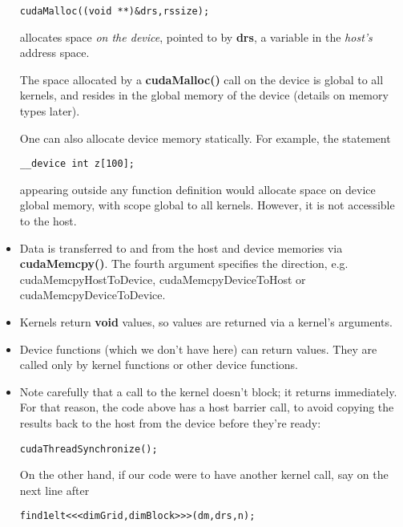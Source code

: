 \begin{itemize}
\begin{Verbatim}[fontsize=\relsize{-2}]
cudaMalloc((void **)&drs,rssize);
\end{Verbatim}

allocates space {\it on the device}, pointed to by {\bf drs}, a variable
in the {\it host's} address space.

The space allocated by a {\bf cudaMalloc()} call on the device is global
to all kernels, and resides in the global memory of the device (details
on memory types later).

One can also allocate device memory statically.  For example, the
statement

\begin{Verbatim}[fontsize=\relsize{-2}]
__device int z[100];
\end{Verbatim}

appearing outside any function definition would allocate space on device
global memory, with scope global to all kernels.  However, it is not
accessible to the host.

\item Data is transferred to and from the host and device memories via
{\bf cudaMemcpy()}.  The fourth argument specifies the direction, e.g.
cudaMemcpyHostToDevice, cudaMemcpyDeviceToHost or
cudaMemcpyDeviceToDevice.

\item Kernels return {\bf void} values, so values are returned
via a kernel's arguments.  

\item Device functions (which we don't have here) can return values.
They are called only by kernel functions or other device functions.

\item Note carefully that a call to the kernel doesn't block; it returns
immediately.  For that reason, the code above has a host barrier call,
to avoid copying the results back to the host from the device before
they're ready:

\begin{Verbatim}[fontsize=\relsize{-2}]
cudaThreadSynchronize();
\end{Verbatim}

On the other hand, if our code were to have another kernel call, say on
the next line after 

\begin{Verbatim}[fontsize=\relsize{-2}]
find1elt<<<dimGrid,dimBlock>>>(dm,drs,n);
\end{Verbatim}


\end{itemize}
